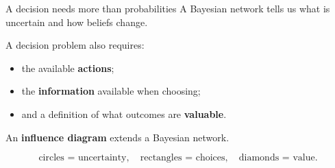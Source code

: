 \documentclass[aspectratio=43,11pt]{beamer}
\begin{document}
\begin{frame}{A decision needs more than probabilities}
\small
A Bayesian network tells us what is uncertain and how beliefs change.

A decision problem also requires:

\begin{itemize}
  \item the available \textbf{actions};
  \item the \textbf{information} available when choosing;
  \item and a definition of what outcomes are \textbf{valuable}.
\end{itemize}

\medskip

An \textbf{influence diagram} extends a Bayesian network.

\begin{center}
\end{center}
\[
\text{circles = uncertainty},\quad
\text{rectangles = choices},\quad
\text{diamonds = value}.
\]

\end{frame}
\end{document}
